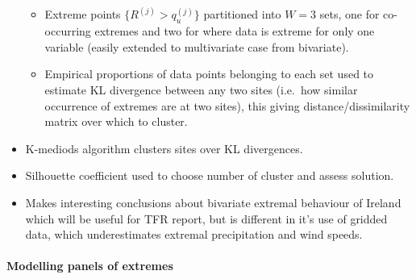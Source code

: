 \documentclass{article}
\numberwithin{equation}{section}
\begin{document}
\begin{itemize}
\begin{itemize}
  \item Extreme points $\{R^{(j)} > q_u^{(j)}\}$ partitioned into $W = 3$ sets, one for co-occurring extremes and two for where data is extreme for only one variable (easily extended to multivariate case from bivariate).
  \item Empirical proportions of data points belonging to each set used to estimate KL divergence between any two sites (i.e.\ how similar occurrence of extremes are at two sites), this giving distance/dissimilarity matrix over which to cluster.
  \end{itemize}
  \item K-mediods algorithm clusters sites over KL divergences. 
  \item Silhouette coefficient used to choose number of cluster and assess solution. 
  \item Makes interesting conclusions about bivariate extremal behaviour of Ireland which will be useful for TFR report, but is different in it's use of gridded data, which underestimates extremal precipitation and wind speeds. 
\end{itemize}

\paragraph{Modelling panels of extremes}
\end{document}
